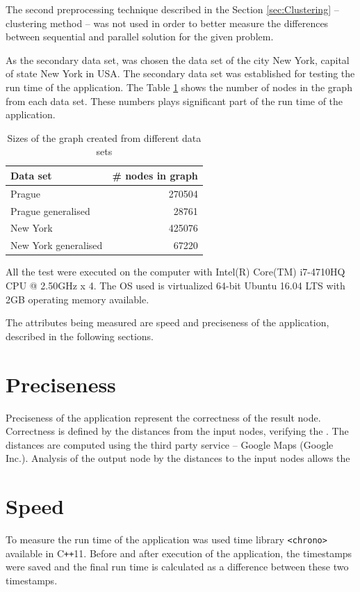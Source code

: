 \documentclass[thesis=M,english]{FITthesis}[2012/10/20]
\begin{document}
The second preprocessing technique described in the Section \ref{sec:Clustering} -- clustering method -- was not used in order to better measure the differences between sequential and parallel solution for the given problem. 


As the secondary data set, was chosen the data set of the city New York, capital of state New York in USA. The secondary data set was established for testing the run time of the application. The Table \ref{tab:gnodes} shows the number of nodes in the graph from each data set. These numbers plays significant part of the run time of the application.

\begin{table}[h]
 \centering
 \caption{Sizes of the graph created from different data sets}
 \label{tab:gnodes}
 \begin{tabular}{|l|r|}
 \hline
 \textbf{Data set}    & \textbf{\# nodes in graph} \\ \hline
 Prague               & 270504                     \\ \hline
 Prague generalised   & 28761                      \\ \hline
 New York             & 425076                     \\ \hline
 New York generalised & 67220                      \\ \hline
 \end{tabular}
\end{table}


All the test were executed on the computer with Intel(R) Core(TM) i7-4710HQ CPU @ 2.50GHz x 4. The OS used is virtualized 64-bit Ubuntu 16.04 LTS with 2GB operating memory available.


The attributes being measured are speed and preciseness of the application, described in the following sections.

\section{Preciseness}
Preciseness of the application represent the correctness of the result node. Correctness is defined by the distances from the input nodes, verifying the . The distances are computed using the third party service -- Google Maps (Google Inc.). Analysis of the output node by the distances to the input nodes allows the 

\section{Speed}
To measure the run time of the application was used time library \texttt{<chrono>} available in C\texttt{++}11. Before and after execution of the application, the timestamps were saved and the final run time is calculated as a difference between these two timestamps.
\end{document}
